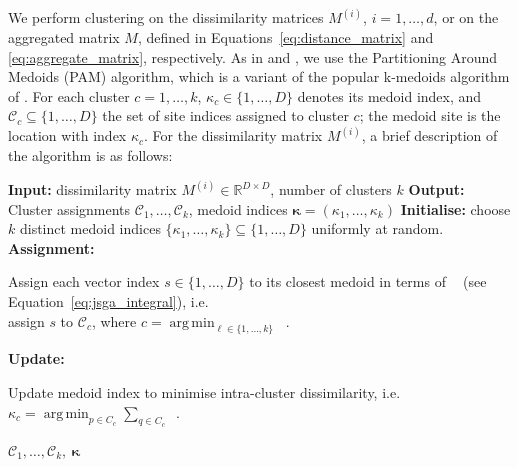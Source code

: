 \documentclass[preprint,12pt,authoryear]{elsarticle}
\DeclareMathOperator*{\argmin}{arg\,min}
\newcommand{\eJSGa}[1]{\mathop{\mathrm{eJS}_{i, #1}^{\mathrm{G}_{\lambda}}}\nolimits}
\DeclareRobustCommand{\eJSGai}{\mathop{\mathrm{eJS}^{\mathrm{G}_{\lambda}}}\nolimits}
\begin{document}
We perform clustering on the dissimilarity matrices $M^{(i)}$, $i = 1, \ldots, d$, or on the aggregated matrix $M$, defined in Equations~\eqref{eq:distance_matrix} and \eqref{eq:aggregate_matrix}, respectively.
As in \citet{Bernard2013} and \citet{Vignotto2021}, we use the Partitioning Around Medoids (PAM) algorithm, which is a variant of the popular k-medoids algorithm of \citet{Kaufman1987}.
For each cluster $c = 1, \ldots, k$, $\kappa_c \in \{1, \ldots, D\}$ denotes its medoid index, and $\mathcal{C}_c \subseteq \{1, \ldots, D\}$ the set of site indices assigned to cluster $c$; the medoid site is the location with index $\kappa_c$.
For the dissimilarity matrix $M^{(i)}$, a brief description of the algorithm is as follows:
\begin{algorithm}[htb]
  \caption{Partitioning Around Medoids (PAM) algorithm using the $\eJSGai{}$ divergence.}
  \label{alg:kmedoids_kappa}
  \begin{algorithmic}[1]
    \State \textbf{Input:} dissimilarity matrix $M^{(i)}\in\mathbb{R}^{D\times D}$, number of clusters $k$
    \State \textbf{Output:} Cluster assignments $\mathcal{C}_1,\dots,\mathcal{C}_k$, medoid indices $\boldsymbol{\kappa}=(\kappa_1,\dots,\kappa_k)$
    \State \textbf{Initialise:} choose $k$ distinct medoid indices $\{\kappa_1,\dots,\kappa_k\}\subseteq\{1,\dots,D\}$ uniformly at random.
    \Repeat
    \State \textbf{Assignment:} \parbox[t]{.82\linewidth}{\raggedright Assign each vector index $s\in\{1,\dots,D\}$ to its closest medoid in terms of $\eJSGai{}$ (see Equation~\eqref{eq:jsga_integral}), i.e.\ \\ assign $s$ to $\mathcal{C}_c$, where $c = \argmin_{\ell\in\{1,\dots,k\}} \eJSGa{s,\kappa_\ell}$.}
        \State \textbf{Update:} \parbox[t]{.82\linewidth}{\raggedright Update medoid index to minimise intra-cluster dissimilarity, i.e.\ $\kappa_c = \argmin_{p\in C_c}\sum_{q\in C_c} \eJSGa{p,q}$.}
        \State {}
      \EndFor
    \State \Return $\mathcal{C}_1,\dots,\mathcal{C}_k,\ \boldsymbol{\kappa}$
  \end{algorithmic}
\end{algorithm}
\end{document}
